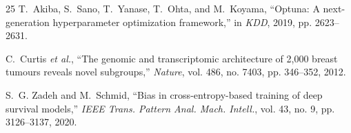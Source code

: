 \documentclass[conference]{IEEEtran}
\begin{document}
\begin{thebibliography}{25}
T.~Akiba, S.~Sano, T.~Yanase, T.~Ohta, and M.~Koyama, ``Optuna: A next-generation hyperparameter optimization framework,'' in \emph{KDD}, 2019, pp. 2623--2631.

C.~Curtis \emph{et al.}, ``The genomic and transcriptomic architecture of 2,000 breast tumours reveals novel subgroups,'' \emph{Nature}, vol. 486, no. 7403, pp. 346--352, 2012.

S.~G. Zadeh and M.~Schmid, ``Bias in cross-entropy-based training of deep survival models,'' \emph{IEEE Trans. Pattern Anal. Mach. Intell.}, vol. 43, no. 9, pp. 3126--3137, 2020.

\end{thebibliography}
\end{document}
